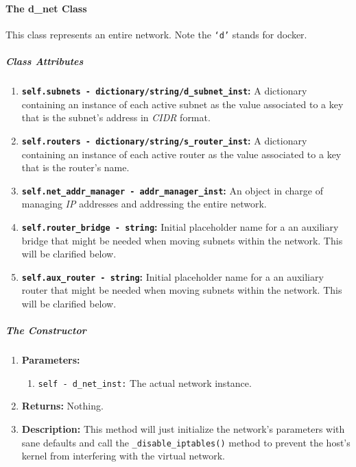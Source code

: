     \paragraph{The d\_net Class}
        This class represents an entire network. Note the \texttt{`d'} stands for docker.

        \subparagraph{Class Attributes}
            \begin{enumerate}
                \item \textbf{\texttt{self.subnets - dictionary/string/d\_subnet\_inst}:} A dictionary containing an instance of each active subnet as the value associated to a key that is the subnet's address in \textit{CIDR} format.
                \item \textbf{\texttt{self.routers - dictionary/string/s\_router\_inst}:} A dictionary containing an instance of each active router as the value associated to a key that is the router's name.
                \item \textbf{\texttt{self.net\_addr\_manager - addr\_manager\_inst}:} An object in charge of managing \textit{IP} addresses and addressing the entire network.
                \item \textbf{\texttt{self.router\_bridge - string}:} Initial placeholder name for a an auxiliary bridge that might be needed when moving subnets within the network. This will be clarified below.
                \item \textbf{\texttt{self.aux\_router - string}:} Initial placeholder name for a an auxiliary router that might be needed when moving subnets within the network. This will be clarified below.
            \end{enumerate}

        \subparagraph{The Constructor}
            \begin{enumerate}
                \item \textbf{Parameters:}
                \begin{enumerate}
                    \item \texttt{self - d\_net\_inst:} The actual network instance.
                \end{enumerate}
                \item \textbf{Returns:} Nothing.
                \item \textbf{Description:} This method will just initialize the network's parameters with sane defaults and call the \texttt{\_disable\_iptables()} method to prevent the host's kernel from interfering with the virtual network.
            \end{enumerate}

